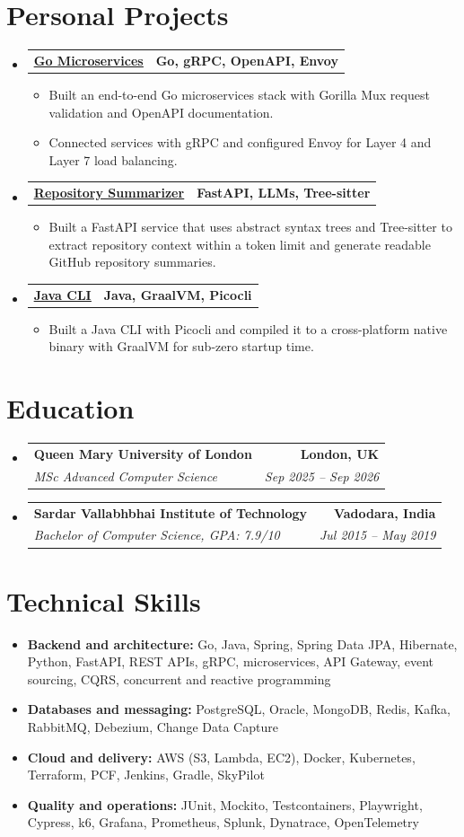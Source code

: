 \documentclass[a4paper,10pt]{article}
\makeatletter
\newcommand{\cvLink}[2]{\href{#1}{\underline{#2}}}
\newcommand{\resumeItem}[1]{\item\small #1}
\newcommand{\resumeSubheading}[4]{
  \item[]
  \begin{tabular*}{\textwidth}{l@{\extracolsep{\fill}}r}
    \textbf{#1} & \textbf{\small #2} \\
    \textit{\small #3} & \textit{\small #4}
  \end{tabular*}\vspace{-3pt}
}
\newcommand{\resumeProjectHeading}[2]{
  \item[]
  \begin{tabular*}{\textwidth}{l@{\extracolsep{\fill}}r}
    \textbf{#1} & \textbf{\small #2}
  \end{tabular*}\vspace{-4pt}
}
\newcommand{\resumeSubHeadingListStart}{\begin{itemize}[leftmargin=0pt,label={},itemsep=1pt,topsep=1pt]}
\newcommand{\resumeSubHeadingListEnd}{\end{itemize}}
\newcommand{\resumeItemListStart}{\begin{itemize}[leftmargin=14pt,itemsep=1.4pt,topsep=2pt,parsep=0pt]}
\newcommand{\resumeItemListEnd}{\end{itemize}\vspace{1pt}}
\makeatother
\begin{document}
\section{Personal Projects}
\resumeSubHeadingListStart
  \resumeProjectHeading{\cvLink{https://github.com/aymanapatel/golang-microservices}{Go Microservices}}{Go, gRPC, OpenAPI, Envoy}
  \resumeItemListStart
    \resumeItem{Built an end-to-end Go microservices stack with Gorilla Mux request validation and OpenAPI documentation.}
    \resumeItem{Connected services with gRPC and configured Envoy for Layer 4 and Layer 7 load balancing.}
  \resumeItemListEnd

  \resumeProjectHeading{\cvLink{https://github.com/aymanapatel/nebius-project}{Repository Summarizer}}{FastAPI, LLMs, Tree-sitter}
  \resumeItemListStart
    \resumeItem{Built a FastAPI service that uses abstract syntax trees and Tree-sitter to extract repository context within a token limit and generate readable GitHub repository summaries.}
  \resumeItemListEnd

  \resumeProjectHeading{\cvLink{https://github.com/aymanapatel/java-cli}{Java CLI}}{Java, GraalVM, Picocli}
  \resumeItemListStart
    \resumeItem{Built a Java CLI with Picocli and compiled it to a cross-platform native binary with GraalVM for sub-zero startup time.}
  \resumeItemListEnd
\resumeSubHeadingListEnd

\section{Education}
\resumeSubHeadingListStart
  \resumeSubheading{Queen Mary University of London}{London, UK}{MSc Advanced Computer Science}{Sep 2025 -- Sep 2026}
  \resumeSubheading{Sardar Vallabhbhai Institute of Technology}{Vadodara, India}{Bachelor of Computer Science, GPA: 7.9/10}{Jul 2015 -- May 2019}
\resumeSubHeadingListEnd

\section{Technical Skills}
\begin{itemize}[leftmargin=0pt,label={},itemsep=2pt,topsep=1pt]
  \small
  \item \textbf{Backend and architecture:} Go, Java, Spring, Spring Data JPA, Hibernate, Python, FastAPI, REST APIs, gRPC, microservices, API Gateway, event sourcing, CQRS, concurrent and reactive programming
  \item \textbf{Databases and messaging:} PostgreSQL, Oracle, MongoDB, Redis, Kafka, RabbitMQ, Debezium, Change Data Capture
  \item \textbf{Cloud and delivery:} AWS (S3, Lambda, EC2), Docker, Kubernetes, Terraform, PCF, Jenkins, Gradle, SkyPilot
  \item \textbf{Quality and operations:} JUnit, Mockito, Testcontainers, Playwright, Cypress, k6, Grafana, Prometheus, Splunk, Dynatrace, OpenTelemetry
\end{itemize}
\end{document}
